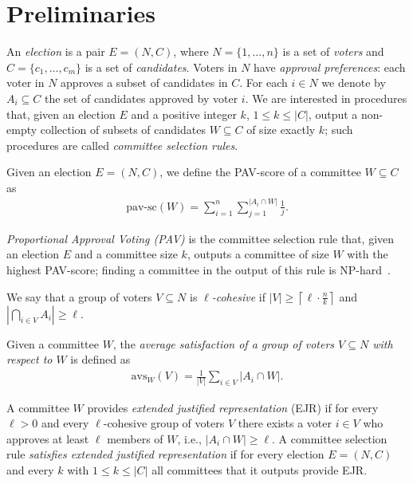 \documentclass[envcountsame]{llncs}
\newcommand{\pavscore}{{{\mathrm{pav\text{-}sc}}}}
\newcommand{\aver}[1]{{{\mathrm{avs}_{#1}}}}
\begin{document}
\section{Preliminaries}
An {\em election} is a pair $E = (N, C)$, where $N = \{1, \ldots, n\}$ is a set of \emph{voters} and 
$C = \{c_1, \ldots, c_m\}$ is a set of \emph{candidates}. Voters in $N$ have {\em approval preferences}:
each voter in $N$ approves a subset of candidates in $C$. 
For each $i\in N$ we denote by $A_i \subseteq C$ the set of candidates approved by voter $i$.
We are interested in procedures that, given an election $E$ and a positive integer $k$, $1\le k\le |C|$,
output a non-empty collection of 
subsets of candidates $W\subseteq C$ of size exactly $k$; such procedures are called 
{\em committee selection rules}.

Given an election $E=(N, C)$, we define the PAV-score of a committee $W\subseteq C$ as
\begin{align*}
\pavscore(W) = \sum_{i = 1}^n \sum_{j = 1}^{|A_i \cap W|} \frac{1}{j} \text{.}
\end{align*}

{\em Proportional Approval Voting (PAV)} is the committee selection rule that, given an election
$E$ and a committee size $k$, outputs a committee of size $W$ with the highest PAV-score;
finding a committee in the output of this rule is NP-hard~\cite{AGG+14a,owaWinner}. 

We say that a group of voters $V \subseteq N$ is {\em $\ell$-cohesive} if 
$|V| \geq \left\lceil \ell \cdot \frac{n}{k} \right\rceil$ and $|\bigcap_{i \in V}A_i| \geq \ell$.

\begin{definition}
  Given a committee $W$, the \emph{average satisfaction of a group of voters $V\subseteq N$ 
  with respect to $W$} is defined as 
  \begin{align*}
  \aver{W}(V) = \frac{1}{|V|}\sum_{i\in V} |A_i \cap W|.
  \end{align*}
\end{definition}

\begin{definition}
  A committee $W$ provides \emph{extended justified representation} (EJR) if for every $\ell>0$ 
  and every $\ell$-cohesive group of voters $V$
  there exists a voter $i \in V$ who approves at least $\ell$ members of $W$, i.e., $|A_i\cap W|\geq \ell$.
  A committee selection rule {\em satisfies extended justified representation} 
  if for every election $E=(N, C)$ and every $k$ with $1\le k\le |C|$ all committees that 
  it outputs provide EJR. 
\end{definition} 
\end{document}
